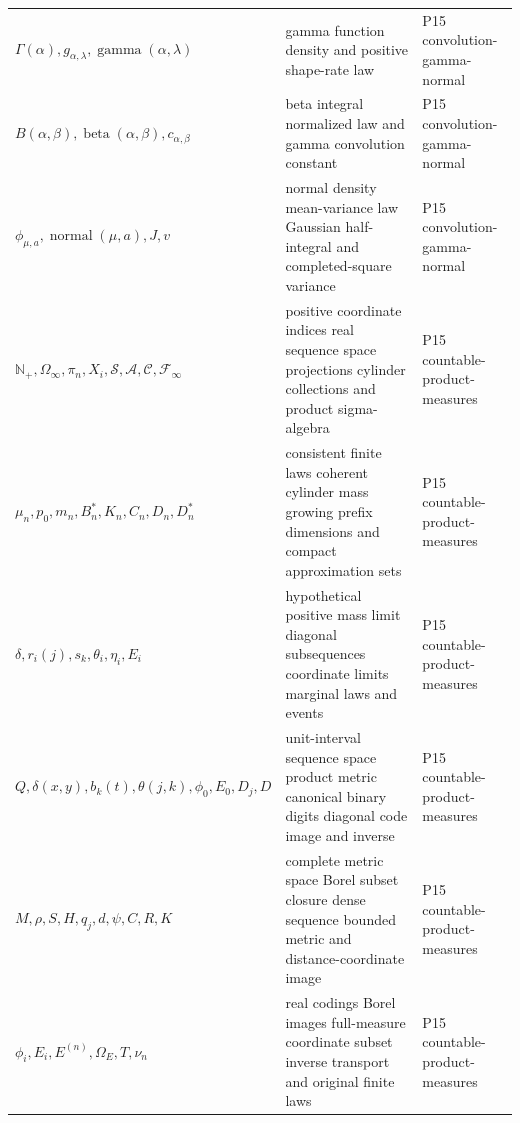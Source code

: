 \begin{longtable}{@{}p{}p{}p{}@{}}
\(\Gamma(\alpha),\allowbreak g_{\alpha,\lambda},\allowbreak \operatorname{gamma}(\alpha,\allowbreak \lambda)\) & gamma function density and positive shape-rate law & P15 convolution-\allowbreak{}gamma-\allowbreak{}normal \\
\(B(\alpha,\allowbreak \beta),\allowbreak \operatorname{beta}(\alpha,\allowbreak \beta),\allowbreak c_{\alpha,\beta}\) & beta integral normalized law and gamma convolution constant & P15 convolution-\allowbreak{}gamma-\allowbreak{}normal \\
\(\phi_{\mu,a},\allowbreak \operatorname{normal}(\mu,\allowbreak a),\allowbreak J,\allowbreak v\) & normal density mean-variance law Gaussian half-integral and completed-square variance & P15 convolution-\allowbreak{}gamma-\allowbreak{}normal \\
\(\mathbb N_+,\allowbreak \Omega_\infty,\allowbreak \pi_n,\allowbreak X_i,\allowbreak \mathcal S,\allowbreak \mathcal A,\allowbreak \mathcal C,\allowbreak \mathcal F_\infty\) & positive coordinate indices real sequence space projections cylinder collections and product sigma-algebra & P15 countable-\allowbreak{}product-\allowbreak{}measures \\
\(\mu_n,\allowbreak p_0,\allowbreak m_n,\allowbreak B_n^*,\allowbreak K_n,\allowbreak C_n,\allowbreak D_n,\allowbreak D_n^*\) & consistent finite laws coherent cylinder mass growing prefix dimensions and compact approximation sets & P15 countable-\allowbreak{}product-\allowbreak{}measures \\
\(\delta,\allowbreak r_i(j),\allowbreak s_k,\allowbreak \theta_i,\allowbreak \eta_i,\allowbreak E_i\) & hypothetical positive mass limit diagonal subsequences coordinate limits marginal laws and events & P15 countable-\allowbreak{}product-\allowbreak{}measures \\
\(Q,\allowbreak \delta(x,\allowbreak y),\allowbreak b_k(t),\allowbreak \theta(j,\allowbreak k),\allowbreak \phi_0,\allowbreak E_0,\allowbreak D_j,\allowbreak D\) & unit-interval sequence space product metric canonical binary digits diagonal code image and inverse & P15 countable-\allowbreak{}product-\allowbreak{}measures \\
\(M,\allowbreak \rho,\allowbreak S,\allowbreak H,\allowbreak q_j,\allowbreak d,\allowbreak \psi,\allowbreak C,\allowbreak R,\allowbreak K\) & complete metric space Borel subset closure dense sequence bounded metric and distance-coordinate image & P15 countable-\allowbreak{}product-\allowbreak{}measures \\
\(\phi_i,\allowbreak E_i,\allowbreak E^{(n)},\allowbreak \Omega_E,\allowbreak T,\allowbreak \nu_n\) & real codings Borel images full-measure coordinate subset inverse transport and original finite laws & P15 countable-\allowbreak{}product-\allowbreak{}measures \\

\end{longtable}
